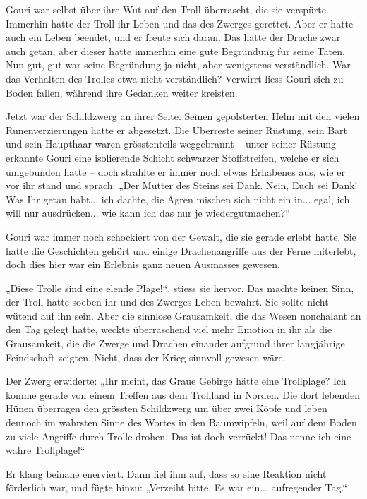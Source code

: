 \documentclass[10pt, a4paper, oneside]{book}
\begin{document}
Gouri war selbst über ihre Wut auf den Troll überrascht, die sie verspürte. Immerhin hatte der Troll ihr Leben und das des Zwerges gerettet. Aber er hatte auch ein Leben beendet, und er freute sich daran. Das hätte der Drache zwar auch getan, aber dieser hatte immerhin eine gute Begründung für seine Taten. Nun gut, gut war seine Begründung ja nicht, aber wenigstens verständlich. War das Verhalten des Trolles etwa nicht verständlich? Verwirrt liess Gouri sich zu Boden fallen, während ihre Gedanken weiter kreisten.

Jetzt war der Schildzwerg an ihrer Seite. Seinen gepolsterten Helm mit den vielen Runenverzierungen hatte er abgesetzt. Die Überreste seiner Rüstung, sein Bart und sein Haupthaar waren grösstenteils weggebrannt – unter seiner Rüstung erkannte Gouri eine isolierende Schicht schwarzer Stoffstreifen, welche er sich umgebunden hatte – doch strahlte er immer noch etwas Erhabenes aus, wie er vor ihr stand und sprach: „Der Mutter des Steins sei Dank. Nein, Euch sei Dank! Was Ihr getan habt... ich dachte, die Agren mischen sich nicht ein in... egal, ich will nur ausdrücken... wie kann ich das nur je wiedergutmachen?“

Gouri war immer noch schockiert von der Gewalt, die sie gerade erlebt hatte. Sie hatte die Geschichten gehört und einige Drachenangriffe aus der Ferne miterlebt, doch dies hier war ein Erlebnis ganz neuen Ausmasses gewesen.

„Diese Trolle sind eine elende Plage!“, stiess sie hervor. Das machte keinen Sinn, der Troll hatte soeben ihr und des Zwerges Leben bewahrt. Sie sollte nicht wütend auf ihn sein. Aber die sinnlose Grausamkeit, die das Wesen nonchalant an den Tag gelegt hatte, weckte überraschend viel mehr Emotion in ihr als die Grausamkeit, die die Zwerge und Drachen einander aufgrund ihrer langjährige Feindschaft zeigten. Nicht, dass der Krieg sinnvoll gewesen wäre.

Der Zwerg erwiderte: „Ihr meint, das Graue Gebirge hätte eine Trollplage? Ich komme gerade von einem Treffen aus dem Trollland in Norden. Die dort lebenden Hünen überragen den grössten Schildzwerg um über zwei Köpfe und leben dennoch im wahrsten Sinne des Wortes in den Baumwipfeln, weil auf dem Boden zu viele Angriffe durch Trolle drohen. Das ist doch verrückt! Das nenne ich eine wahre Trollplage!“

Er klang beinahe enerviert. Dann fiel ihm auf, dass so eine Reaktion nicht förderlich war, und fügte hinzu: „Verzeiht bitte. Es war ein... aufregender Tag.“
\end{document}
